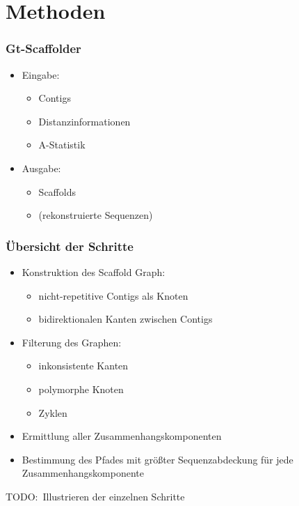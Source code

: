 \documentclass[xcolor=pst]{beamer}
\begin{document}
\section{Methoden}

\begin{frame}
  \frametitle{Gt-Scaffolder}
  \begin{itemize}
  \item Eingabe:
    \begin{itemize}
    \item Contigs
    \item Distanzinformationen
    \item A-Statistik %
    \end{itemize}
  \item Ausgabe:
    \begin{itemize}
    \item Scaffolds
    \item (rekonstruierte Sequenzen)
    \end{itemize}
  \end{itemize}
\end{frame}

\begin{frame}
  \frametitle{Übersicht der Schritte}
  \begin{itemize}
  \item Konstruktion des Scaffold Graph:
    \begin{itemize}
    \item nicht-repetitive Contigs als Knoten
    \item bidirektionalen Kanten zwischen Contigs
    \end{itemize}
  \item Filterung des Graphen:
    \begin{itemize}
    \item inkonsistente Kanten
    \item polymorphe Knoten
    \item Zyklen
    \end{itemize}
  \item Ermittlung aller Zusammenhangskomponenten
  \item Bestimmung des Pfades mit größter Sequenzabdeckung für jede
    Zusammenhangskomponente
  \end{itemize}
  TODO:\ Illustrieren der einzelnen Schritte
\end{frame}
\end{document}
